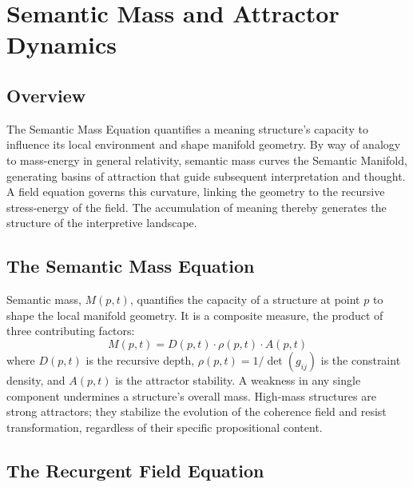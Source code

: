 \chapter{Semantic Mass and Attractor Dynamics}\label{ch:semantic_mass_and_attractor_dynamics}


\section{Overview}

The Semantic Mass Equation quantifies a meaning structure's capacity to influence its local environment and shape manifold geometry. By way of analogy to mass-energy in general relativity, semantic mass curves the Semantic Manifold, generating basins of attraction that guide subsequent interpretation and thought. A field equation governs this curvature, linking the geometry to the recursive stress-energy of the field. The accumulation of meaning thereby generates the structure of the interpretive landscape.


\section{The Semantic Mass Equation}\label{sec:the_semantic_mass_equation}

Semantic mass, \(M(p,t)\), quantifies the capacity of a structure at point \(p\) to shape the local manifold geometry. It is a composite measure, the product of three contributing factors:
\begin{equation}
M(p, t) = D(p, t) \cdot \rho(p, t) \cdot A(p, t)
\end{equation}
where \(D(p, t)\) is the recursive depth, \(\rho(p, t) = 1/\det(g_{ij})\) is the constraint density, and \(A(p, t)\) is the attractor stability. A weakness in any single component undermines a structure's overall mass. High-mass structures are strong attractors; they stabilize the evolution of the coherence field and resist transformation, regardless of their specific propositional content.


\section{The Recurgent Field Equation}\label{sec:the_recurgent_field_equation}

